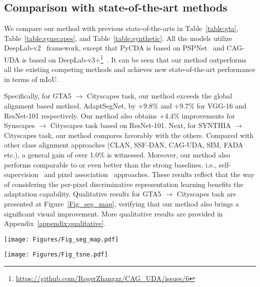 \documentclass[runningheads]{llncs}
\begin{document}
\subsection{Comparison with state-of-the-art methods}
We compare our method with previous state-of-the-arts in Table~\ref{table:gta}, Table~\ref{table:synscapes}, and Table~\ref{table:synthetic}. All the models utilize DeepLab-v2~\cite{chen2018deeplab} framework, except that PyCDA is based on PSPNet~\cite{zhao2017pspnet} and CAG-UDA is based on DeepLab-v3+\footnote{\url{https://github.com/RogerZhangzz/CAG_UDA/issues/6}}~\cite{chen2018encoderdecoder}. It can be seen that our method outperforms all the existing competing methods and achieves new state-of-the-art performance in terms of mIoU. 

Specifically, for GTA5 $\rightarrow$ Cityscapes task, our method exceeds the global alignment based method, AdaptSegNet, by +9.8\% and +9.7\% for VGG-16 and ResNet-101 respectively. Our method also obtains +4.4\% improvements for Synscapes $\rightarrow$ Cityscapes task based on ResNet-101. Next, for SYNTHIA $\rightarrow$ Cityscapes task, our method compares favorably with the others. Compared with other class alignment approaches (CLAN, SSF-DAN, CAG-UDA, SIM, FADA etc.), a general gain of over 1.0\% is witnessed. Moreover, our method also performs comparable to or even better than the strong baselines, i.e., self-supervision~\cite{li2019bidirectional,lian2019pycda,pan2020unsupervised,vu2019advent,zou2019confidence} and pixel association~\cite{kang2020pixel,pixmatch2021_CVPR} approaches. These results reflect that the way of considering the per-pixel discriminative representation learning benefits the adaptation capability. Qualitative results for GTA5 $\rightarrow$ Cityscapes task are presented at Figure~\ref{Fig_seg_map}, verifying that our method also brings a significant visual improvement. More qualitative results are provided in Appendix~\ref{appendix:qualitative}.

\begin{figure*}
    \centering
    \texttt{[image: Figures/Fig\_seg\_map.pdf]}\caption{Qualitative results for GTA5 $\rightarrow$ Cityscapes task. For each target image, we show results with global alignment (AdaptSegNet), coarse-grained class alignment (CLAN) and our method, and the ground-truth label map.}
    \label{Fig_seg_map}
    \vspace{-4mm}
\end{figure*}
\begin{figure*}
    \centering
    \texttt{[image: Figures/Fig\_tsne.pdf]}\caption{Comparisons of segmentation result and t-SNE visualization~\cite{maaten2008visualizing} between CAG-UDA~\cite{zhang2019category} and our method.}
    \label{Fig_tsne}
    \vspace{-3mm}
\end{figure*}
\end{document}
